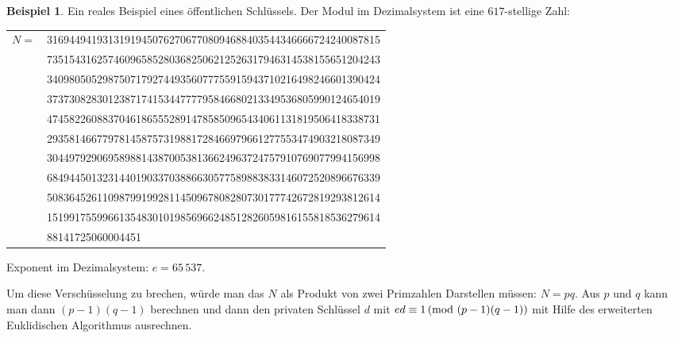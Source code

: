 \documentclass[
a4paper,landscape,16pt,
bibliography=totocnumbered,
numbers=noenddot,
]{scrartcl}
\numberwithin{equation}{subsection}
\theoremstyle{plain}
\theoremstyle{definition}
\newtheorem*{bsp}{Beispiel}
\begin{document}
\begin{bsp}
	Ein reales Beispiel eines öffentlichen Schlüssels.  %
Der Modul im Dezimalsystem ist eine $617$-stellige Zahl: 
\begin{center}
\begin{tabular}{rl}
$N=$ &316944941931319194507627067708094688403544346666724240087815
\\&735154316257460965852803682506212526317946314538155651204243
\\&340980505298750717927449356077755915943710216498246601390424
\\&373730828301238717415344777795846680213349536805990124654019
\\&474582260883704618655528914785850965434061131819506418338731
\\&293581466779781458757319881728466979661277553474903218087349
\\&304497929069589881438700538136624963724757910769077994156998
\\&684944501323144019033703886630577589883833146072520896676339
\\&508364526110987991992811450967808280730177742672819293812614
\\&151991755996613548301019856966248512826059816155818536279614
\\&88141725060004451
\end{tabular}
\end{center} 

Exponent im Dezimalsystem: $e=65\,537$. 

Um diese Verschüsselung zu brechen, würde man das $N$ als Produkt von zwei Primzahlen Darstellen müssen: $N = pq$. Aus $p$ und $q$ kann man dann $(p-1)(q-1)$ berechnen und dann den privaten Schlüssel $d$ mit $e d \equiv 1 \,(\mathrm{mod} \ (p-1)(q-1))$ mit Hilfe des erweiterten Euklidischen Algorithmus ausrechnen. 
\end{bsp} 
\end{document}
